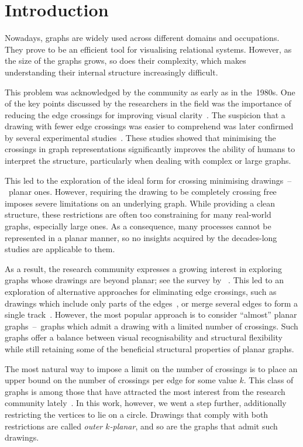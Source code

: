\chapter{Introduction}\label{ch:introduction}

Nowadays, graphs are widely used across different domains and occupations. They prove to be an efficient tool for visualising relational systems. However, as the size of the graphs grows, so does their complexity, which makes understanding their internal structure increasingly difficult.

This problem was acknowledged by the community as early as in the~1980s. One of the key points discussed by the researchers in the field was the importance of reducing the edge crossings for improving visual clarity~\cite{early-few-crossing}. The suspicion that a drawing with fewer edge crossings was easier to comprehend was later confirmed by several experimental studies~\cite{graph-aesthetic-survey}. These studies showed that minimising the crossings in graph representations significantly improves the ability of humans to interpret the structure, particularly when dealing with complex or large graphs.

This led to the exploration of the ideal form for crossing minimising drawings~--~planar ones. However, requiring the drawing to be completely crossing free imposes severe limitations on an underlying graph. While providing a clean structure, these restrictions are often too constraining for many real-world graphs, especially large ones. As a consequence, many processes cannot be represented in a planar manner, so no insights acquired by the decades-long studies are applicable to them.

As a result, the research community expresses a growing interest in exploring graphs whose drawings are beyond planar; see the survey by \citeauthor{beyond-planarity-survey}~\cite{beyond-planarity-survey}. This led to an exploration of alternative approaches for eliminating edge crossings, such as drawings which include only parts of the edges~\cite{break-the-edge,break-the-edge2}, or merge several edges to form a single track~\cite{confluent-drawings}. However, the most popular approach is to consider ``almost'' planar graphs~--~graphs which admit a drawing with a limited number of crossings. Such graphs offer a balance between visual recognisability and structural flexibility while still retaining some of the beneficial structural properties of planar graphs.

The most natural way to impose a limit on the number of crossings is to place an upper bound on the number of crossings per edge for some value \(k\). This class of graphs is among those that have attracted the most interest from the research community lately~\cite{contest}. In this work, however, we went a step further, additionally restricting the vertices to lie on a circle. Drawings that comply with both restrictions are called \emph{outer \(k\)-planar}, and so are the graphs that admit such drawings.


